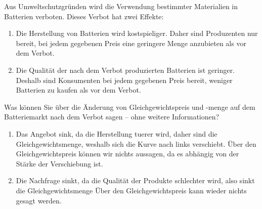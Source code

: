 \begin{question}
	Aus Umweltschutzgründen wird die Verwendung bestimmter Materialien in Batterien verboten. Dieses
	Verbot hat zwei Effekte:
	\begin{enumerate}
		\item Die Herstellung von Batterien wird kostspieliger. Daher sind Produzenten nur bereit, bei
		      jedem gegebenen Preis eine geringere Menge anzubieten als vor dem Verbot.
		\item Die Qualität der nach dem Verbot produzierten Batterien ist geringer. Deshalb sind Konsumenten bei jedem gegebenen Preis bereit, weniger Batterien zu kaufen als vor dem Verbot.
	\end{enumerate}
	Was können Sie über die Änderung von Gleichgewichtspreis und -menge auf dem Batteriemarkt nach dem Verbot sagen – ohne weitere Informationen?
\end{question}
\begin{solution}
	\begin{enumerate}
		\item Das Angebot sink, da die Herstellung tuerer wird, daher sind die Gleichgewichtsmenge, weshalb sich die Kurve nach links verschiebt.
		      Über den Gleichgewichtspreis können wir nichts aussagen, da es abhängig von der Stärke der Verschiebung ist.
		\item Die Nachfrage sinkt, da die Qualität der Produkte schlechter wird, also sinkt die Gleichgewichtsmenge
		      Über den Gleichgewichtspreis kann wieder nichts gesagt werden.
	\end{enumerate}
\end{solution}


